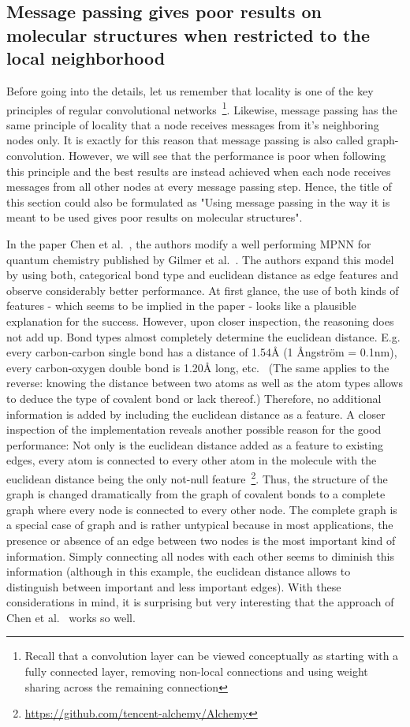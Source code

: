 \subsection{Message passing gives poor results on molecular structures when restricted to the local neighborhood}
\label{sec:neighborhood-expansion}

Before going into the details, let us remember that locality is one of the key principles of regular convolutional networks~\footnote{
	Recall that a convolution layer can be viewed conceptually as starting with a fully connected layer, removing non-local connections and using weight sharing across the remaining connection
}. Likewise, message passing has the same principle of locality that a node receives messages from it's neighboring nodes only. It is exactly for this reason that message passing is also called graph-convolution. However, we will see that the performance is poor when following this principle and the best results are instead achieved when each node receives messages from all other nodes at every message passing step. Hence, the title of this section could also be formulated as "Using message passing in the way it is meant to be used gives poor results on molecular structures".


In the paper Chen et al.~\cite{Chen2019}, the authors modify a well performing MPNN for quantum chemistry published by Gilmer et al.~\cite{Gilmer2017}. The authors expand this model by using both, categorical bond type and euclidean distance as edge features and observe considerably better performance. At first glance, the use of both kinds of features - which seems to be implied in the paper - looks like a plausible explanation for the success. However, upon closer inspection, the reasoning does not add up. Bond types almost completely determine the euclidean distance. E.g. every carbon-carbon single bond has a distance of 1.54Å (1 Ångström = 0.1nm), every carbon-oxygen double bond is 1.20Å long, etc.~\cite{Organic-chemistry} (The same applies to the reverse: knowing the distance between two atoms as well as the atom types allows to deduce the type of covalent bond or lack thereof.) Therefore, no additional information is added by including the euclidean distance as a feature. A closer inspection of the implementation reveals another possible reason for the good performance: Not only is the euclidean distance added as a feature to existing edges, every atom is connected to every other atom in the molecule with the euclidean distance being the only not-null feature~\footnote{\url{https://github.com/tencent-alchemy/Alchemy}}. Thus, the structure of the graph is changed dramatically from the graph of covalent bonds to a complete graph where every node is connected to every other node. The complete graph is a special case of graph and is rather untypical because in most applications, the presence or absence of an edge between two nodes is the most important kind of information. Simply connecting all nodes with each other seems to diminish this information (although in this example, the euclidean distance allows to distinguish between important and less important edges). With these considerations in mind, it is surprising but very interesting that the approach of Chen et al.~\cite{Chen2019} works so well.

